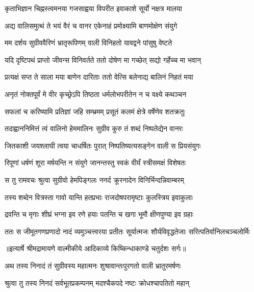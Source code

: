 \twolineshloka
{कृताभिज्ञान चिह्नस्त्वमनया गजसाह्वया}
{विपरीत इवाकाशे सूर्यो नक्षत्र मालया} %

\twolineshloka
{अद्य वालिसमुत्थं ते भयं वैरं च वानर}
{एकेनाहं प्रमोक्ष्यामि बाणमोक्षेण संयुगे} %

\twolineshloka
{मम दर्शय सुग्रीववैरिणं भ्रातृरूपिणम्}
{वाली विनिहतो यावद्वने पांसुषु वेष्टते} %

\twolineshloka
{यदि दृष्टिपथं प्राप्तो जीवन्स विनिवर्तते}
{ततो दोषेण मा गच्छेत् सद्यो गर्हेच्च मा भवान्} %

\twolineshloka
{प्रत्यक्षं सप्त ते साला मया बाणेन दारिताः}
{ततो वेत्सि बलेनाद्य बालिनं निहतं मया} %

\twolineshloka
{अनृतं नोक्तपूर्वं मे वीर कृच्छ्रेऽपि तिष्ठता}
{धर्मलोभपरीतेन न च वक्ष्ये कथञ्चन} %

\twolineshloka
{सफलां च करिष्यामि प्रतिज्ञां जहि सम्भ्रमम्}
{प्रसूतं कलमं क्षेत्रे वर्षेणेव शतक्रतुः} %

\twolineshloka
{तदाह्वाननिमित्तं त्वं वालिनो हेममालिनः}
{सुग्रीव कुरु तं शब्दं निष्पतेद्येन वानरः} %

\twolineshloka
{जितकाशी जयश्लाघी त्वया चाधर्षितः पुरात्}
{निष्पतिष्यत्यसङ्गेन वाली स प्रियसंयुगः} %

\twolineshloka
{रिपूणां धर्षणं शूरा मर्षयन्ति न संयुगे}
{जानन्तस्तु स्वकं वीर्यं स्त्रीसमक्षं विशेषतः} %

\twolineshloka
{स तु रामवचः श्रुत्वा सुग्रीवो हेमपिङ्गलः}
{ननर्द क्रूरनादेन विनिर्भिन्दन्निवाम्बरम्} %

\twolineshloka
{तस्य शब्देन वित्रस्ता गावो यान्ति हतप्रभाः}
{राजदोषपरामृष्टाः कुलस्त्रिय इवाकुलाः} %

\twolineshloka
{द्रवन्ति च मृगाः शीघ्रं भग्ना इव रणे हयाः}
{पतन्ति च खगा भूमौ क्षीणपुण्या इव ग्रहाः} %

\fourlineindentedshloka
{ततः स जीमूतगणप्रणादो}
{नादं व्यमुञ्चत्त्वरया प्रतीतः}
{सूर्यात्मजः शौर्यविवृद्धतेजाः}
{सरित्पतिर्वानिलचञ्चलोर्मिः} %


{॥इत्यार्षे श्रीमद्रामायणे वाल्मीकीये आदिकाव्ये किष्किन्धाकाण्डे चतुर्दशः सर्गः॥}


\twolineshloka
{अथ तस्य निनादं तं सुग्रीवस्य महात्मनः}
{शुश्रावान्तःपुरगतो वाली भ्रातुरमर्षणः} %

\twolineshloka
{श्रुत्वा तु तस्य निनदं सर्वभूतप्रकम्पनम्}
{मदश्चैकपदे नष्टः क्रोधश्चापतितो महान्} %

